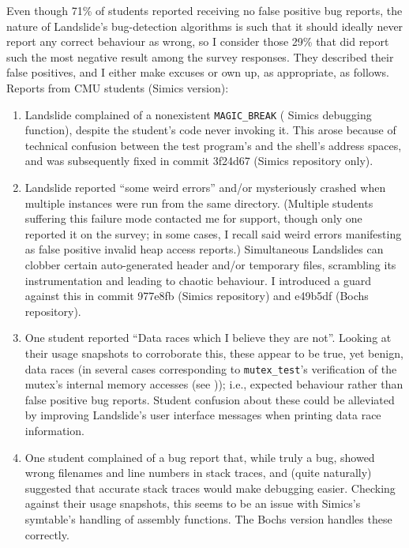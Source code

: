 Even though 71\% of students reported receiving no false positive bug reports,
the nature of Landslide's bug-detection algorithms is such
that it should ideally never report any correct behaviour as wrong,
so I consider those 29\% that did report such the most negative result among the survey responses.
They described their false positives, and I either make excuses or own up, as appropriate, as follows.
Reports from CMU students (Simics version):
\begin{enumerate}
	\item Landslide complained of a nonexistent {\tt MAGIC\_BREAK} ( Simics debugging function),
		despite the student's code never invoking it.
		This arose because of technical confusion between the test program's and the shell's address spaces,
		and was subsequently fixed in commit 3f24d67 (Simics repository only).
	\item Landslide reported ``some weird errors'' and/or mysteriously crashed
		when multiple instances were run from the same directory.
		(Multiple students suffering this failure mode contacted me for support,
		though only one reported it on the survey;
		in some cases, I recall said weird errors manifesting as false positive invalid heap access reports.)
		Simultaneous Landslides can clobber certain auto-generated header and/or temporary files,
		scrambling its instrumentation and leading to chaotic behaviour.
		I introduced a guard against this in commit 977e8fb (Simics repository) and e49b5df (Bochs repository).
	\item One student reported ``Data races which I believe they are not''.
		Looking at their usage snapshots to corroborate this,
		these appear to be true, yet benign, data races
		(in several cases corresponding to {\tt mutex\_test}'s verification of the mutex's internal memory accesses
		(see \sect{\ref{sec:education-pebbles-tests}}));
		i.e., expected behaviour rather than false positive bug reports.
		Student confusion about these could be alleviated
		by improving Landslide's user interface messages when printing data race information. %
	\item One student complained of a bug report that, while truly a bug, showed wrong filenames and line numbers in stack traces,
		and (quite naturally) suggested that accurate stack traces would make debugging easier.
		Checking against their usage snapshots,
		this seems to be an issue with Simics's symtable's handling of assembly functions.
		The Bochs version handles these correctly.

\end{enumerate}
